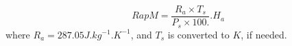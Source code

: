 \[
RapM = \frac{ R_a \times T_s }{P_s \times 100.} . H_a
\]
where $R_a = 287.05 J.kg^{-1}.K^{-1} $, and $T_s$ is converted to $K$, if needed.
